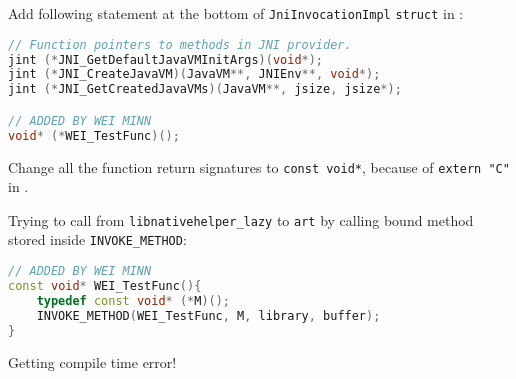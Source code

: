 Add following statement at the bottom of \texttt{JniInvocationImpl} \texttt{struct} in : 
\begin{lstlisting}[language=C++]
// Function pointers to methods in JNI provider.
jint (*JNI_GetDefaultJavaVMInitArgs)(void*);
jint (*JNI_CreateJavaVM)(JavaVM**, JNIEnv**, void*);
jint (*JNI_GetCreatedJavaVMs)(JavaVM**, jsize, jsize*);

// ADDED BY WEI MINN
void* (*WEI_TestFunc)();
\end{lstlisting}

Change all the function return signatures to \texttt{const void*}, because of \texttt{extern "C"} in .

Trying to call from \texttt{libnativehelper\_lazy} to \texttt{art} by calling bound method stored inside \texttt{INVOKE\_METHOD}:
\begin{lstlisting}[language=C++]
// ADDED BY WEI MINN
const void* WEI_TestFunc(){
    typedef const void* (*M)();
    INVOKE_METHOD(WEI_TestFunc, M, library, buffer);
}
\end{lstlisting}
Getting compile time error!



